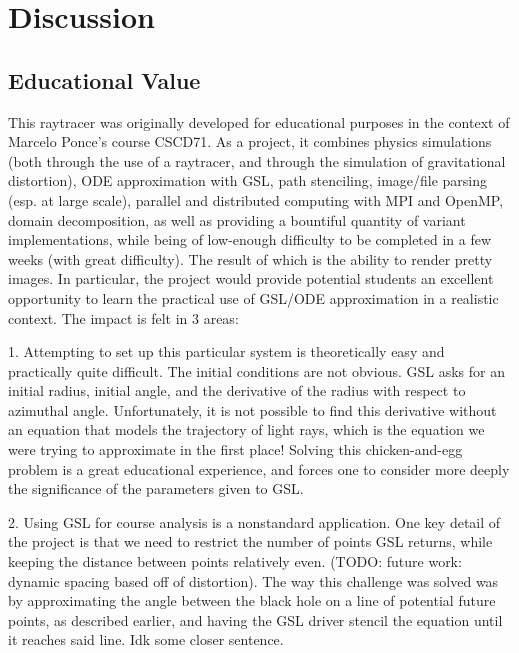 
\section{Discussion}
\label{sec:disc}

\subsection {Educational Value}


This raytracer was originally developed for educational purposes in the context of Marcelo Ponce's course CSCD71. As a project, it combines physics simulations (both through the use of a raytracer, and through the simulation of gravitational distortion), ODE approximation with GSL, path stenciling, image/file parsing (esp. at large scale), parallel and distributed computing with MPI and OpenMP, domain decomposition, as well as providing a bountiful quantity of variant implementations, while being of low-enough difficulty to be completed in a few weeks (with great difficulty). The result of which is the ability to render pretty images. In particular, the project would provide potential students an excellent opportunity to learn the practical use of GSL/ODE approximation in a realistic context. The impact is felt in 3 areas:

1. Attempting to set up this particular system is theoretically easy and practically quite difficult. The initial conditions are not obvious. GSL asks for an initial radius, initial angle, and the derivative of the radius with respect to azimuthal angle. Unfortunately, it is not possible to find this derivative without an equation that models the trajectory of light rays, which is the equation we were trying to approximate in the first place! Solving this chicken-and-egg problem is a great educational experience, and forces one to consider more deeply the significance of the parameters given to GSL. 

2. Using GSL for course analysis is a nonstandard application. One key detail of the project is that we need to restrict the number of points GSL returns, while keeping the distance between points relatively even. (TODO: future work: dynamic spacing based off of distortion). The way this challenge was solved was by approximating the angle between the black hole on a line of potential future points, as described earlier, and having the GSL driver stencil the equation until it reaches said line. Idk some closer sentence.

